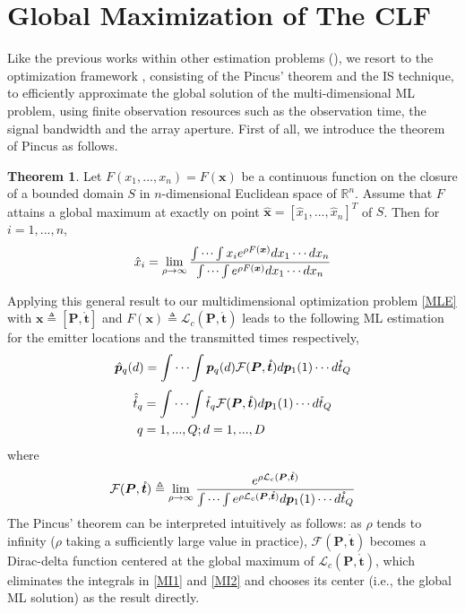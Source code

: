\documentclass[review]{elsarticle}
\begin{document}
\section{Global Maximization of The CLF}\label{sec3}
Like the previous works within other estimation problems (\cite{Kay2000Mean,ISdoa2008,Saha2002Maximum,Wang2010Maximum,Chen2008Joint}), we resort to the optimization framework \cite{Kay2000Mean}, consisting of the Pincus' theorem \cite{Pincus1968A} and the IS technique, to efficiently approximate the global solution of the multi-dimensional ML problem, using finite observation resources such as the observation time, the signal bandwidth and the array aperture.
First of all, we introduce the theorem of Pincus \cite{Pincus1968A} as follows.
\theoremstyle{definition} \newtheorem{Theorem}{Theorem}
\begin{Theorem}
    Let $F(x_1,...,x_n)=F(\boldsymbol{x})$ be a continuous function on the closure of a bounded domain $S$ in $n$-dimensional Euclidean space of $\mathbb{R}^n$. Assume that $F$ attains a global maximum at exactly on point $\hat{\boldsymbol{x}}=[\hat{x}_1,...,\hat{x}_n]^T$ of $S$. Then for $i=1,...,n$,
    \begin{align}\label{Pincus}
    \hat{x}_i=\lim_{\rho\to \infty}\frac{\idotsint x_i e^{\rho F(\boldsymbol{x})}dx_1\cdots dx_n}{\idotsint e^{\rho F(\boldsymbol{x})}dx_1\cdots dx_n}
    \end{align}
\end{Theorem}
Applying this general result to our multidimensional optimization problem \eqref{MLE} with $\boldsymbol{x}\triangleq[\boldsymbol{P},\mathring{\boldsymbol{t}}]$ and $F(\boldsymbol{x})\triangleq \mathcal{L}_c(\boldsymbol{P},\mathring{\boldsymbol{t}})$ leads to the following ML estimation for the emitter locations and the transmitted times respectively,
\begin{align}\label{MI1}
    \hat{\boldsymbol{p}}_q(d)=\idotsint \boldsymbol{p}_q(d) \mathcal{F}(\boldsymbol{P},\mathring{\boldsymbol{t}})d\boldsymbol{p}_1(1) \cdots d\mathring{t}_Q
\end{align}
\begin{align}\label{MI2}    
    \hat{\mathring{t}}_q&=\idotsint \mathring{t}_q \mathcal{F}(\boldsymbol{P},\mathring{\boldsymbol{t}})d\boldsymbol{p}_1(1) \cdots d\mathring{t}_Q\\ 
    q&=1,...,Q;d=1,...,D \nonumber
\end{align}
where 
\begin{align}\label{gc}
    \mathcal{F}(\boldsymbol{P},\mathring{\boldsymbol{t}})\triangleq\lim_{\rho\to \infty}\frac{e^{\rho \mathcal{L}_c(\boldsymbol{P},\mathring{\boldsymbol{t}})}}{\idotsint e^{\rho \mathcal{L}_c(\boldsymbol{P},\mathring{\boldsymbol{t}})}d\boldsymbol{p}_1(1) \cdots d\mathring{t}_Q}
\end{align}
The Pincus' theorem can be interpreted intuitively as follows: as $\rho$ tends to infinity ($\rho$ taking a sufficiently large value in practice), $\mathcal{F}(\boldsymbol{P},\mathring{\boldsymbol{t}})$ becomes a Dirac-delta function centered at the global maximum of $\mathcal{L}_c(\boldsymbol{P},\mathring{\boldsymbol{t}})$, which eliminates the integrals in \eqref{MI1} and \eqref{MI2} and chooses its center (i.e., the global ML solution) as the result directly. 
\end{document}
